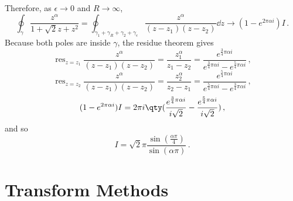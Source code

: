\documentclass{article}
\theoremstyle{plain}\theoremheaderfont{\normalfont\itshape}\theorembodyfont{\rmfamily}\theoremseparator{.}\newtheorem*{rem}{Remark}\newtheorem*{ex}{Example}\newtheorem*{proof}{Proof}\newtheorem*{altp}{Alternative proof}
\theoremstyle{plain}\theoremheaderfont{\normalfont\bfseries}\theorembodyfont{\rmfamily}\theoremseparator{.}\newtheorem{thm}{Theorem}[section]\newtheorem{lem}[thm]{Lemma}\newtheorem{prop}[thm]{Proposition}\newtheorem*{cor}{Corollary}\newtheorem{defn}[thm]{Definition}\newtheorem{clm}[thm]{Claim}\newtheorem{clminproof}{Claim}
\theoremstyle{break}\theoremheaderfont{\normalfont\itshape}\theorembodyfont{\rmfamily}\theoremseparator{.\medskip}\newtheorem*{proofskip}{Proof}\newtheorem*{exs}{Examples}\newtheorem*{rems}{Remarks}
\theoremstyle{break}\theoremheaderfont{\normalfont\bfseries}\theorembodyfont{\rmfamily}\theoremseparator{.\medskip}\newtheorem{lemskip}[thm]{Lemma}\newtheorem{defnskip}[thm]{Definition}\newtheorem{propskip}[thm]{Proposition}\newtheorem{thmskip}[thm]{Theorem}
\numberwithin{equation}{section}
\DeclareMathOperator*{\res}{res}
\begin{document}
	Therefore, as \(\epsilon\to 0\) and \(R\to\infty\),
	\[\oint_\gamma\frac{z^\alpha}{1+\sqrt{2}z+z^2}=\oint_{\gamma_1+\gamma_R+\gamma_2+\gamma_\epsilon}\frac{z^\alpha}{(z-z_1)(z-z_2)}\dd{z}\to (1-e^{2\pi\alpha i})I\,.\]
	Because both poles are inside \(\gamma\), the residue theorem gives
	\[\res_{z=z_1}\frac{z^\alpha}{(z-z_1)(z-z_2)}=\frac{z_1^\alpha}{z_1-z_2}=\frac{e^{\frac{3}{4}\pi\alpha i}}{e^{\frac{3}{4}\pi\alpha i}-e^{\frac{5}{4}\pi\alpha i}}\,,\]
	\[\res_{z=z_2}\frac{z^\alpha}{(z-z_1)(z-z_2)}=\frac{z_2^\alpha}{z_2-z_1}=\frac{e^{\frac{5}{4}\pi\alpha i}}{e^{\frac{5}{4}\pi\alpha i}-e^{\frac{3}{4}\pi\alpha i}}\,,\]
	\[(1-e^{2\pi\alpha i})I=2\pi i\qty(\frac{e^{\frac{3}{4}\pi\alpha i}}{i\sqrt{2}}-\frac{e^{\frac{5}{4}\pi\alpha i}}{i\sqrt{2}})\,,\]
	and so
	\[I=\sqrt{2}\pi\frac{\sin(\frac{\alpha \pi}{4})}{\sin(\alpha\pi)}\,.\]
	
	\newpage

	\section{Transform Methods}\label{Chap:Transform_methods}
\end{document}
